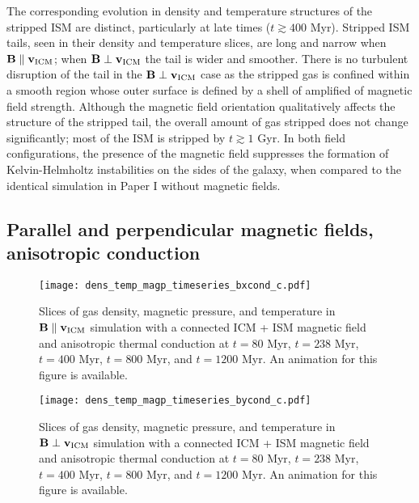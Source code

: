 \documentclass[twocolumn]{aastex6}
\begin{document}
The corresponding evolution in density and temperature structures of the stripped ISM are distinct, particularly at late times ($t \gtrsim 400$ Myr). Stripped ISM tails, seen in their density and temperature slices, are long and narrow when $\mathbf{B} \parallel \mathbf{v_{\rm ICM}}$; when $\mathbf{B} \perp \mathbf{v_{\rm ICM}}$ the tail is wider and smoother. There is no turbulent disruption of the tail in the $\mathbf{B} \perp \mathbf{v_{\rm ICM}}$  case as the stripped gas is confined within a smooth region whose outer surface is defined by a shell of amplified of magnetic field strength. Although the magnetic field orientation qualitatively affects the structure of the stripped tail, the overall amount of gas stripped does not change significantly; most of the ISM is stripped by $t \gtrsim 1$ Gyr. In both field configurations, the presence of the magnetic field suppresses the formation of Kelvin-Helmholtz instabilities on the sides of the galaxy, when compared to the identical simulation in Paper I without magnetic fields.  

\subsection{Parallel and perpendicular magnetic fields, anisotropic conduction }
\label{sec:cond_cont}

\begin{figure*}[!htbp]
  \begin{center}
    {\texttt{[image: dens\_temp\_magp\_timeseries\_bxcond\_c.pdf]}}
     \caption{Slices of gas density, magnetic pressure, and temperature in $\mathbf{B} \parallel \mathbf{v_{\rm ICM}}$ simulation with a connected ICM + ISM magnetic field and anisotropic thermal conduction at $t = 80$ Myr, $t = 238$ Myr, $t = 400$ Myr, $t = 800$ Myr, and $t = 1200$ Myr. An animation for this figure is available. \label{fig:bxcond}}
  \end{center}  
\end{figure*}

\begin{figure*}[!htbp]
  \begin{center}
    {\texttt{[image: dens\_temp\_magp\_timeseries\_bycond\_c.pdf]}}
     \caption{Slices of gas density, magnetic pressure, and temperature in $\mathbf{B} \perp \mathbf{v_{\rm ICM}}$ simulation with a connected ICM + ISM magnetic field and anisotropic thermal conduction at $t = 80$ Myr, $t = 238$ Myr, $t = 400$ Myr, $t = 800$ Myr, and $t = 1200$ Myr. An animation for this figure is available. \label{fig:bycond}}
  \end{center}  
\end{figure*}
\end{document}
